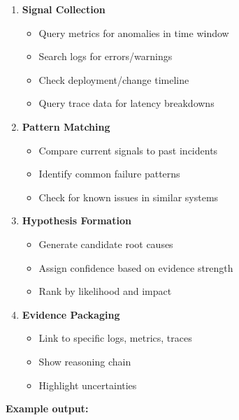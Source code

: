 \begin{enumerate}
    \item \textbf{Signal Collection}
    \begin{itemize}
        \item Query metrics for anomalies in time window
        \item Search logs for errors/warnings
        \item Check deployment/change timeline
        \item Query trace data for latency breakdowns
    \end{itemize}

    \item \textbf{Pattern Matching}
    \begin{itemize}
        \item Compare current signals to past incidents
        \item Identify common failure patterns
        \item Check for known issues in similar systems
    \end{itemize}

    \item \textbf{Hypothesis Formation}
    \begin{itemize}
        \item Generate candidate root causes
        \item Assign confidence based on evidence strength
        \item Rank by likelihood and impact
    \end{itemize}

    \item \textbf{Evidence Packaging}
    \begin{itemize}
        \item Link to specific logs, metrics, traces
        \item Show reasoning chain
        \item Highlight uncertainties
    \end{itemize}
\end{enumerate}

\textbf{Example output:}

